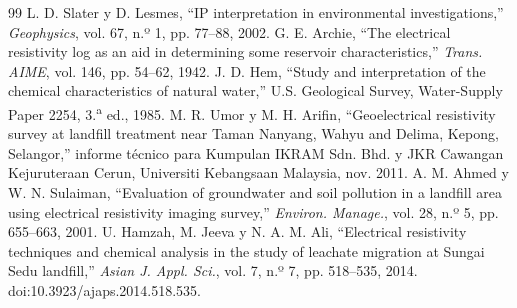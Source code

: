 \documentclass[conference]{IEEEtran}
\begin{document}
\begin{thebibliography}{99}
 L. D. Slater y D. Lesmes, ``IP interpretation in environmental investigations,'' \textit{Geophysics}, vol. 67, n.º 1, pp. 77--88, 2002.
 G. E. Archie, ``The electrical resistivity log as an aid in determining some reservoir characteristics,'' \textit{Trans. AIME}, vol. 146, pp. 54--62, 1942.
 J. D. Hem, ``Study and interpretation of the chemical characteristics of natural water,'' U.S. Geological Survey, Water-Supply Paper 2254, 3.\textsuperscript{a} ed., 1985.
 M. R. Umor y M. H. Arifin, ``Geoelectrical resistivity survey at landfill treatment near Taman Nanyang, Wahyu and Delima, Kepong, Selangor,'' informe técnico para Kumpulan IKRAM Sdn. Bhd. y JKR Cawangan Kejuruteraan Cerun, Universiti Kebangsaan Malaysia, nov. 2011.
 A. M. Ahmed y W. N. Sulaiman, ``Evaluation of groundwater and soil pollution in a landfill area using electrical resistivity imaging survey,'' \textit{Environ. Manage.}, vol. 28, n.º 5, pp. 655--663, 2001.
 U. Hamzah, M. Jeeva y N. A. M. Ali, ``Electrical resistivity techniques and chemical analysis in the study of leachate migration at Sungai Sedu landfill,'' \textit{Asian J. Appl. Sci.}, vol. 7, n.º 7, pp. 518--535, 2014. doi:10.3923/ajaps.2014.518.535.
\end{thebibliography}
\end{document}
